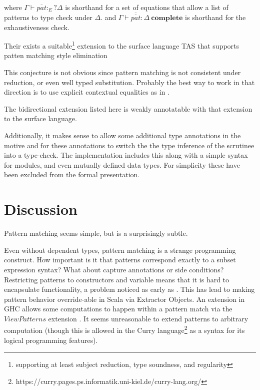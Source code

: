 where $\Gamma\vdash\overline{pat}:_{E}?\Delta$ is shorthand for a
set of equations that allow a list of patterns to type check under
$\Delta$. and $\Gamma\vdash\overline{\overline{pat}}:\Delta\ \mathbf{complete}$
is shorthand for the exhaustiveness check. 
\begin{conjecture}
Their exists a suitable\footnote{supporting at least subject reduction, type soundness, and regularity}
extension to the surface language TAS that supports patten matching
style elimination
\end{conjecture}

This conjecture is not obvious since pattern matching is not consistent
under reduction, or even well typed substitution. Probably the best
way to work in that direction is to use explicit contextual equalities
as in \cite{sjoberg2012irrelevance}.
\begin{conjecture}
The bidirectional extension listed here is weakly annotatable with
that extension to the surface language.
\end{conjecture}

Additionally, it makes sense to allow some additional type annotations
in the motive and for these annotations to switch the the type inference
of the scrutinee into a type-check. The implementation includes this
along with a simple syntax for modules, and even mutually defined
data types. For simplicity these have been excluded from the formal
presentation.

\section{Discussion}



Pattern matching seems simple, but is a surprisingly subtle.

Even without dependent types, pattern matching is a strange programming
construct. How important is it that patterns correspond exactly to
a subset expression syntax? What about capture annotations or side
conditions? Restricting patterns to constructors and variable means
that it is hard to encapsulate functionality, a problem noticed as
early as\cite{10.1145/41625.41653} . This has lead
to making pattern behavior override-able in Scala via Extractor Objects.
An extension in GHC allows some computations to happen within a pattern
match via the $ViewPatterns$ extension .
It seems unreasonable to extend patterns to arbitrary computation
(though this is allowed in the Curry language\footnote{https://curry.pages.ps.informatik.uni-kiel.de/curry-lang.org/}
as a syntax for its logical programming features). 

